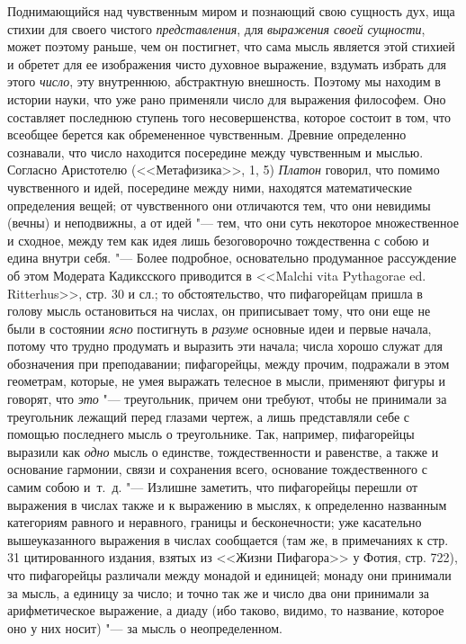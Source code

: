 Поднимающийся над чувственным миром и познающий свою сущность дух, ища
стихии для своего чистого {\em представления}, для
{\em выражения своей сущности}, может поэтому раньше,
чем он постигнет, что сама мысль является этой стихией и обретет для ее
изображения чисто духовное выражение, вздумать избрать для этого
{\em число}, эту внутреннюю, абстрактную внешность.
Поэтому мы находим в истории науки, что уже рано применяли число для
выражения философем. Оно составляет последнюю ступень того несовершенства,
которое состоит в том, что всеобщее берется как обремененное чувственным.
Древние определенно сознавали, что число находится посередине между
чувственным и мыслью. Согласно Аристотелю (<<Метафизика>>, 1, 5)
{\em Платон} говорил, что помимо чувственного и идей,
посередине между ними, находятся математические определения вещей; от
чувственного они отличаются тем, что они невидимы (вечны) и неподвижны, а
от идей "--- тем, что они суть некоторое множественное и сходное, между тем
как идея лишь безоговорочно тождественна с собою и едина внутри себя. "---
Более подробное, основательно продуманное рассуждение об этом Модерата
Кадиксского приводится в <<Malchi vita Pythagorae ed. Ritterhus>>, стр. 30 и
сл.; то обстоятельство, что пифагорейцам пришла в голову мысль остановиться
на числах, он приписывает тому, что они еще не были в состоянии
{\em ясно} постигнуть в
{\em разуме} основные идеи и первые начала, потому что
трудно продумать и выразить эти начала; числа хорошо служат для обозначения
при преподавании; пифагорейцы, между прочим, подражали в этом геометрам,
которые, не умея выражать телесное в мысли, применяют фигуры и говорят, что
{\em это} "--- треугольник, причем они требуют, чтобы не
принимали за треугольник лежащий перед глазами чертеж, а лишь представляли
себе с помощью последнего мысль о треугольнике. Так, например, пифагорейцы
выразили как {\em одно} мысль о единстве,
тождественности и равенстве, а также и основание гармонии, связи и
сохранения всего, основание тождественного с самим собою и~т.~д. "--- Излишне
заметить, что пифагорейцы перешли от выражения в числах также и к выражению
в мыслях, к определенно названным категориям равного и неравного, границы и
бесконечности; уже касательно вышеуказанного выражения в числах сообщается
(там же, в примечаниях к стр. 31 цитированного издания, взятых из <<Жизни
Пифагора>> у Фотия, стр. 722), что пифагорейцы различали между монадой и
единицей; монаду они принимали за мысль, а единицу за число; и точно так же
и число два они принимали за арифметическое выражение, а диаду (ибо таково,
видимо, то название, которое оно у них носит) "--- за мысль о неопределенном.
